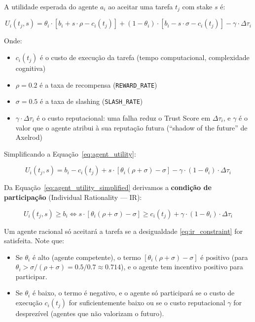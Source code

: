 A utilidade esperada do agente $a_i$ ao aceitar uma tarefa $t_j$ com stake $s$ é:

\begin{equation}\label{eq:agent_utility}
U_i(t_j, s) = \theta_i \cdot [b_i + s \cdot \rho - c_i(t_j)] + (1 - \theta_i) \cdot [b_i - s \cdot \sigma - c_i(t_j)] - \gamma \cdot \Delta\tau_i
\end{equation}

Onde:
\begin{itemize}
    \item $c_i(t_j)$ é o custo de execução da tarefa (tempo computacional, complexidade cognitiva)
    \item $\rho = 0.2$ é a taxa de recompensa (\texttt{REWARD\_RATE})
    \item $\sigma = 0.5$ é a taxa de slashing (\texttt{SLASH\_RATE})
    \item $\gamma \cdot \Delta\tau_i$ é o custo reputacional: uma falha reduz o Trust Score em $\Delta\tau_i$, e $\gamma$ é o valor que o agente atribui à sua reputação futura (``shadow of the future'' de Axelrod)
\end{itemize}

Simplificando a Equação~\eqref{eq:agent_utility}:

\begin{equation}\label{eq:agent_utility_simplified}
U_i(t_j, s) = b_i - c_i(t_j) + s \cdot [\theta_i(\rho + \sigma) - \sigma] - \gamma \cdot (1 - \theta_i) \cdot \Delta\tau_i
\end{equation}

Da Equação~\eqref{eq:agent_utility_simplified} derivamos a \textbf{condição de participação} (Individual Rationality --- IR):

\begin{equation}\label{eq:ir_constraint}
U_i(t_j, s) \geq b_i \iff s \cdot [\theta_i(\rho + \sigma) - \sigma] \geq c_i(t_j) + \gamma \cdot (1 - \theta_i) \cdot \Delta\tau_i
\end{equation}

Um agente racional só aceitará a tarefa se a desigualdade \eqref{eq:ir_constraint} for satisfeita. Note que:

\begin{itemize}
    \item Se $\theta_i$ é alto (agente competente), o termo $[\theta_i(\rho + \sigma) - \sigma]$ é positivo (para $\theta_i > \sigma/(\rho+\sigma) = 0.5/0.7 \approx 0.714$), e o agente tem incentivo positivo para participar.
    \item Se $\theta_i$ é baixo, o termo é negativo, e o agente só participará se o custo de execução $c_i(t_j)$ for suficientemente baixo ou se o custo reputacional $\gamma$ for desprezível (agentes que não valorizam o futuro).
\end{itemize}

